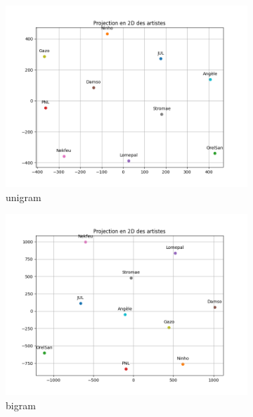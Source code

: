 \documentclass[a4paper]{article}
\begin{document}
\begin{figure}[ht]
    \begin{subfigure}{0.32\textwidth}
        \centering
        \includegraphics[width=\linewidth]{../results/genius_results/MDS_1.png}
        \caption{unigram}
    \end{subfigure}
    \hfill
    \begin{subfigure}{0.32\textwidth}
        \centering
        \includegraphics[width=\linewidth]{../results/genius_results/MDS_2.png}
        \caption{bigram}
    \end{subfigure}
    \hfill
    \begin{subfigure}{0.32\textwidth}
        \centering

\end{subfigure}
\end{figure}
\end{document}
